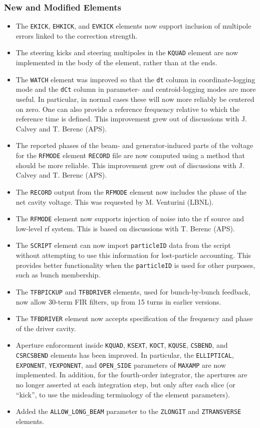\documentclass[11pt]{article}
\begin{document}
\subsubsection{New and Modified Elements}
\begin{itemize}
\item The \verb|EKICK|, \verb|EHKICK|, and \verb|EVKICK| elements now support inclusion of multipole errors linked to the
  correction strength.
\item The steering kicks and steering multipoles in the \verb|KQUAD| element are now implemented in the body of the element,
  rather than at the ends.
\item The \verb|WATCH| element was improved so that the \verb|dt| column in coordinate-logging mode and the \verb|dCt| column in
  parameter- and centroid-logging modes are more useful. In particular, in normal cases these will now more reliably be centered
  on zero. One can also provide a reference frequency relative to which the reference time is defined. This improvement grew out of
  discussions with J. Calvey and T. Berenc (APS).
\item The reported phases of the beam- and generator-induced parts of the voltage for the \verb|RFMODE| element \verb|RECORD| file
  are now computed using a method that should be more reliable. This improvement grew out of
  discussions with J. Calvey and T. Berenc (APS).
\item The \verb|RECORD| output from the \verb|RFMODE| element now includes the phase of the net cavity voltage. This was requested
  by M. Venturini (LBNL).
\item The \verb|RFMODE| element now supports injection of noise into the rf source and low-level rf system. This is based on discussions
  with T. Berenc (APS).
\item The \verb|SCRIPT| element can now import \verb|particleID| data from the script without attempting to use this information
  for lost-particle accounting. This provides better functionality when the \verb|particleID| is used for other purposes, such as
  bunch membership.
\item The \verb|TFBPICKUP| and \verb|TFBDRIVER| elements, used for bunch-by-bunch feedback, now allow 30-term FIR filters, up from
  15 turns in earlier versions.
\item The \verb|TFBDRIVER| element now accepts specification of the frequency and phase of the driver cavity.
\item Aperture enforcement inside \verb|KQUAD|, \verb|KSEXT|, \verb|KOCT|, \verb|KQUSE|, \verb|CSBEND|, and \verb|CSRCSBEND| elements
  has been improved. In particular, the \verb|ELLIPTICAL|, \verb|EXPONENT|, \verb|YEXPONENT|, and \verb|OPEN_SIDE| parameters of
  \verb|MAXAMP| are now implemented. In addition, for the fourth-order integrator, the apertures are no longer asserted at
  each integration step, but only after each slice (or ``kick'', to use the misleading terminology of the element parameters).
\item Added the \verb|ALLOW_LONG_BEAM| parameter to the \verb|ZLONGIT| and \verb|ZTRANSVERSE| elements.
\end{itemize}
\end{document}
